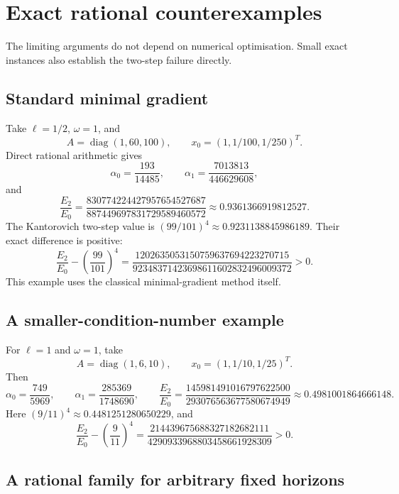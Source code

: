 \documentclass[11pt,a4paper]{article}
\theoremstyle{remark}
\newcommand{\diag}{\operatorname{diag}}
\begin{document}
\section{Exact rational counterexamples}

The limiting arguments do not depend on numerical optimisation. Small exact instances also establish the two-step failure directly.

\subsection{Standard minimal gradient}

Take $\ell=1/2$, $\omega=1$, and
\begin{equation}\label{eq:mgexample}
 A=\diag(1,60,100),\qquad x_0=(1,1/100,1/250)^T.
\end{equation}
Direct rational arithmetic gives
\[
 \alpha_0=\frac{193}{14485},\qquad
 \alpha_1=\frac{7013813}{446629608},
\]
and
\begin{equation}\label{eq:mgratio}
 \frac{E_2}{E_0}
 =\frac{830774224427957654527687}{887449697831729589460572}
 \approx0.9361366919812527.
\end{equation}
The Kantorovich two-step value is $(99/101)^4\approx0.9231138845986189$. Their exact difference is positive:
\[
 \frac{E_2}{E_0}-\left(\frac{99}{101}\right)^4
 =\frac{1202635053150759637694223270715}
 {92348371423698611602832496009372}>0.
\]
This example uses the classical minimal-gradient method itself.

\subsection{A smaller-condition-number example}

For $\ell=1$ and $\omega=1$, take
\[
 A=\diag(1,6,10),\qquad x_0=(1,1/10,1/25)^T.
\]
Then
\[
 \alpha_0=\frac{749}{5969},\qquad
 \alpha_1=\frac{285369}{1748690},\qquad
 \frac{E_2}{E_0}=\frac{145981491016797622500}{293076563677580674949}
 \approx0.4981001864666148.
\]
Here $(9/11)^4\approx0.4481251280650229$, and
\[
 \frac{E_2}{E_0}-\left(\frac9{11}\right)^4
 =\frac{214439675688327182682111}{4290933968803458661928309}>0.
\]

\subsection{A rational family for arbitrary fixed horizons}
\end{document}
